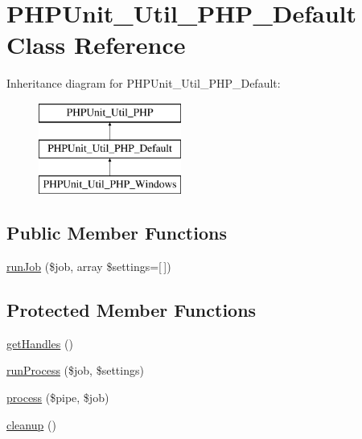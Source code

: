 \hypertarget{class_p_h_p_unit___util___p_h_p___default}{}\section{P\+H\+P\+Unit\+\_\+\+Util\+\_\+\+P\+H\+P\+\_\+\+Default Class Reference}
\label{class_p_h_p_unit___util___p_h_p___default}
Inheritance diagram for P\+H\+P\+Unit\+\_\+\+Util\+\_\+\+P\+H\+P\+\_\+\+Default\+:\begin{figure}[H]
\begin{center}
\leavevmode
\includegraphics[height=3.000000cm]{class_p_h_p_unit___util___p_h_p___default}
\end{center}
\end{figure}
\subsection*{Public Member Functions}
\begin{DoxyCompactItemize}
\item 
\mbox{\hyperlink{class_p_h_p_unit___util___p_h_p___default_a2bdd3292fd85da0f0f30ac8d70bf7ee3}{run\+Job}} (\$job, array \$settings=\mbox{[}$\,$\mbox{]})
\end{DoxyCompactItemize}
\subsection*{Protected Member Functions}
\begin{DoxyCompactItemize}
\item 
\mbox{\hyperlink{class_p_h_p_unit___util___p_h_p___default_ae5dbd216c09bda4ea76d2ca28e27eb00}{get\+Handles}} ()
\item 
\mbox{\hyperlink{class_p_h_p_unit___util___p_h_p___default_ab3791f1e0cb1da9fc370bd297d6a039b}{run\+Process}} (\$job, \$settings)
\item 
\mbox{\hyperlink{class_p_h_p_unit___util___p_h_p___default_a8a2a71393cabfb7b15b158df1a40ebfb}{process}} (\$pipe, \$job)
\item 
\mbox{\hyperlink{class_p_h_p_unit___util___p_h_p___default_aff07c1d29d6d6a540c726948254a1764}{cleanup}} ()
\end{DoxyCompactItemize}
